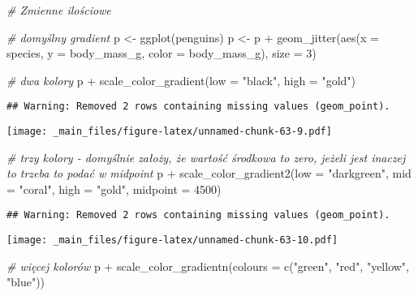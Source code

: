 \documentclass[
]{book}
\newenvironment{Shaded}{\begin{snugshade}}{\end{snugshade}}
\newcommand{\AttributeTok}[1]{\textcolor[rgb]{0.77,0.63,0.00}{#1}}
\newcommand{\CommentTok}[1]{\textcolor[rgb]{0.56,0.35,0.01}{\textit{#1}}}
\newcommand{\DecValTok}[1]{\textcolor[rgb]{0.00,0.00,0.81}{#1}}
\newcommand{\FunctionTok}[1]{\textcolor[rgb]{0.00,0.00,0.00}{#1}}
\newcommand{\NormalTok}[1]{#1}
\newcommand{\OtherTok}[1]{\textcolor[rgb]{0.56,0.35,0.01}{#1}}
\newcommand{\SpecialCharTok}[1]{\textcolor[rgb]{0.00,0.00,0.00}{#1}}
\newcommand{\StringTok}[1]{\textcolor[rgb]{0.31,0.60,0.02}{#1}}
\begin{document}
\begin{Shaded}
\begin{Highlighting}[]
\CommentTok{\# Zmienne ilościowe}

\CommentTok{\# domyślny gradient}
\NormalTok{p }\OtherTok{\textless{}{-}} \FunctionTok{ggplot}\NormalTok{(penguins)}
\NormalTok{p  }\OtherTok{\textless{}{-}}\NormalTok{ p }\SpecialCharTok{+} \FunctionTok{geom\_jitter}\NormalTok{(}\FunctionTok{aes}\NormalTok{(}\AttributeTok{x =}\NormalTok{ species, }\AttributeTok{y =}\NormalTok{ body\_mass\_g, }\AttributeTok{color =}\NormalTok{ body\_mass\_g), }\AttributeTok{size =} \DecValTok{3}\NormalTok{)}

\CommentTok{\# dwa kolory}
\NormalTok{p }\SpecialCharTok{+} \FunctionTok{scale\_color\_gradient}\NormalTok{(}\AttributeTok{low =} \StringTok{"black"}\NormalTok{, }\AttributeTok{high =} \StringTok{"gold"}\NormalTok{)}
\end{Highlighting}
\end{Shaded}

\begin{verbatim}
## Warning: Removed 2 rows containing missing values (geom_point).
\end{verbatim}

\texttt{[image: \_main\_files/figure-latex/unnamed-chunk-63-9.pdf]}

\begin{Shaded}
\begin{Highlighting}[]
\CommentTok{\# trzy kolory {-} domyślnie założy, że wartość środkowa to zero, jeżeli jest inaczej to trzeba to podać w midpoint}
\NormalTok{p }\SpecialCharTok{+} \FunctionTok{scale\_color\_gradient2}\NormalTok{(}\AttributeTok{low =} \StringTok{"darkgreen"}\NormalTok{, }\AttributeTok{mid =} \StringTok{"coral"}\NormalTok{, }\AttributeTok{high =} \StringTok{"gold"}\NormalTok{, }\AttributeTok{midpoint =} \DecValTok{4500}\NormalTok{)}
\end{Highlighting}
\end{Shaded}

\begin{verbatim}
## Warning: Removed 2 rows containing missing values (geom_point).
\end{verbatim}

\texttt{[image: \_main\_files/figure-latex/unnamed-chunk-63-10.pdf]}

\begin{Shaded}
\begin{Highlighting}[]
\CommentTok{\# więcej kolorów}
\NormalTok{p }\SpecialCharTok{+} \FunctionTok{scale\_color\_gradientn}\NormalTok{(}\AttributeTok{colours =} \FunctionTok{c}\NormalTok{(}\StringTok{"green"}\NormalTok{, }\StringTok{"red"}\NormalTok{, }\StringTok{"yellow"}\NormalTok{, }\StringTok{"blue"}\NormalTok{))}
\end{Highlighting}
\end{Shaded}
\end{document}
